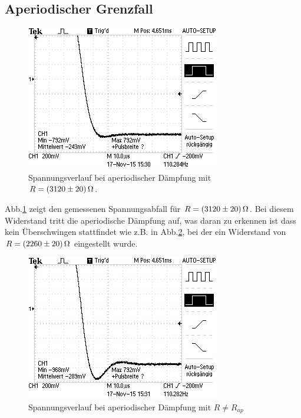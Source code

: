 \subsection{Aperiodischer Grenzfall}
\begin{figure}
  \centering
  \includegraphics[width=\textwidth]{data/F0001TEK.jpg}
  \caption{Spannungsverlauf bei aperiodischer Dämpfung mit $R = \SI{3120 +- 20}{\ohm}$.}
  \label{fig:5bergebnis}
\end{figure}
Abb.\ref{fig:5bergebnis} zeigt den gemessenen Spannungsabfall für
$R = \SI{3120 +- 20}{\ohm}$.
Bei diesem Widerstand tritt die aperiodische Dämpfung auf, was daran zu erkennen
ist dass kein Überschwingen stattfindet wie z.B. in Abb.\ref{fig:über}, bei
der ein Widerstand von $R = \SI{2260 +- 20}{\ohm}$ eingestellt wurde.
\begin{figure}
  \centering
  \includegraphics[width=\textwidth]{data/F0002TEK.jpg}
  \caption{Spannungsverlauf bei aperiodischer Dämpfung mit $R \neq R_{ap}$}
  \label{fig:über}
\end{figure}

